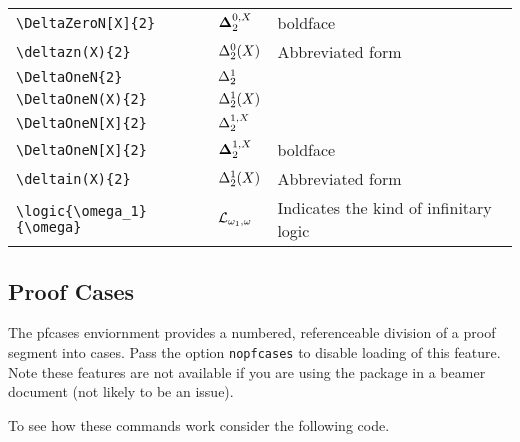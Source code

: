 \documentclass[leqno,11pt]{amsart}
\newcommand{\tab}{\hspace{1cm}}
\begin{document}
\begin{xtabular}{l |  l | l}
	\tab \verb=\DeltaZeroN[X]{2}=           & \( \DeltaZeroN*[X]{2}     \)      & boldface  \\ 
	\tab \verb=\deltazn(X){2}= 							& \( \deltazn(X){2}     \)      & Abbreviated form \\ \midrule
	\verb=\DeltaOneN{2}=                   & \( \DeltaOneN{2}        \)      & \\ 
	\tab \verb=\DeltaOneN(X){2}=           & \( \DeltaOneN(X){2}     \)      & \\ 
	\tab \verb=\DeltaOneN[X]{2}=           & \( \DeltaOneN[X]{2}     \)      & \\
	\tab \verb=\DeltaOneN[X]{2}=           & \( \DeltaOneN*[X]{2}     \)      & boldface  \\ 
	\tab \verb=\deltain(X){2}= 							& \( \deltain(X){2}     \)      & Abbreviated form \\ \midrule

	
	\verb=\logic{\omega_1}{\omega}= & \( \mathcal{L}_{\omega_1,\omega} \) & Indicates the kind of infinitary logic\\
		\bottomrule
\end{xtabular}

\subsection{Proof Cases}


The pfcases enviornment provides a numbered, referenceable division of a proof segment into cases.  Pass the option \verb=nopfcases= to disable loading of this feature.  Note these features are not available if you are using the package in a beamer document (not likely to be an issue).

To see how these commands work consider the following code.
\end{document}
